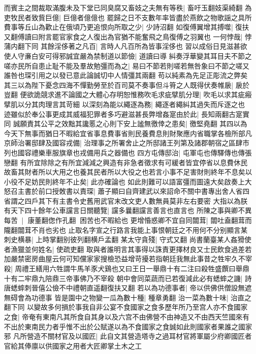 而賓主之間裁取滿腹未及下堂已同臭腐又畜妓之夫無有等秩|{
	畜吁玉翻妓渠綺翻}
為吏牧民者致貲巨億|{
	巨億者億億也}
罷歸之日不支數年率皆盡於燕飲之物歌謡之具所費事等丘山為歡止在俄頃乃更追恨向所取之少|{
	少詩沼翻}
如復傅翼增其搏噬|{
	復扶又翻傅讀曰附言罷官家食之人復出為官猶不能奮飛之鳥復傅之羽翼也}
一何悖哉|{
	悖蒲内翻下同}
其餘淫侈著之凡百|{
	言時人凡百所為皆事淫侈也}
習以成俗日見滋甚欲使人守亷白安可得邪誠宜嚴為禁制道以節儉|{
	道讀曰導}
糾奏浮華變其耳目夫不節之嗟亦民所自患止耻不能及羣故勉彊而為之|{
	易曰不節若則嗟若無咎象曰不節之嗟又誰咎也琛引用之以發已意此論誠切中人情彊其兩翻}
苟以純素為先足正彫流之弊矣其三以為陛下憂念四海不憚勤勞至於百司莫不奏事但斗筲之人既得伏奏帷扆|{
	扆於豈翻}
便欲詭競求進不論國之大體心存明恕惟務吹毛求疵擘肌分理|{
	吹毛以求其疵瘢擘肌以分其肉理言其苛細}
以深刻為能以繩逐為務|{
	繩逐者繩糾其過失而斥逐之也}
迹雖似於奉公事更成其威福犯罪者多巧避滋甚長弊增姦寔由於此|{
	長知兩翻古寔實同}
誠願責其公平之效黜其讒慝之心則下安上謐無徼倖之患矣|{
	徼堅堯翻}
其四以為今天下無事而猶日不暇給宜省事息費事省則民養費息則財聚應内省職掌各檢所部凡京師治署邸肆及國容戎備|{
	治理事之所署舍止之所邸諸王列第及諸郡朝宿之區肆市列也國容禮樂車服旗章也戎備用兵之器備也}
四方屯傳邸治|{
	屯軍屯也傳驛傳也傳張戀翻}
有所宜除除之有所宜減減之興造有非急者徵求有可緩者皆宜停省以息費休民故畜其財者所以大用之也養其民者所以大役之也若言小事不足害財則終年不息矣以小役不足妨民則終年不止矣|{
	此亦確論也}
如此則難可以語富彊而圖遠大矣啟奏上大怒召主書於前口授敇書以責琛|{
	蕭子顯曰自齊建武以來詔命不關中書專出舍人省四省謂之四戶其下有主書令史舊用武官末改文吏人數無員莫非左右要密}
大指以為朕有天下四十餘年公車讜言日關聽覽|{
	讜多曩翻讜言善言也直言也}
所陳之事與卿不異每苦|{
	康董翻偬作孔翻困苦也不暇給也}
更增惛惑卿不宜自同闒茸|{
	闒吐盍翻茸而隴翻闒茸不肖也劣也}
止取名字宣之行路言我能上事恨朝廷之不用何不分别顯言某刺史横暴|{
	上時掌翻别彼列翻横戶孟翻}
某太守貪殘|{
	守式又翻}
尚書蘭臺某人姦猾使者漁獵並何姓名|{
	使疏吏翻}
取與者誰明言其事得以誅責更擇材良又士民飲食過差若加嚴禁密房曲屋云何可知儻家家搜檢恐益增苛擾若指朝廷我無此事昔之牲牢久不宰殺|{
	周禮王繕用六牲謂牛馬羊豕犬鷄也又曰王日一舉鼎十有二注曰殺牲盛饌曰舉鼎十有二牢鼎九陪鼎三帝事佛乃不宰殺}
朝中會同菜蔬而已若復減此必有蟋蟀之譏|{
	詩唐蟋蟀刺晉僖公儉不中禮朝直遥翻復扶又翻}
若以為功德事者|{
	帝以供佛供僧設無遮無碍會為功德事}
皆是園中之物變一瓜為數十種|{
	種章勇翻}
治一菜為數十味|{
	治直之翻下同}
以變故多何損於事我自非公宴不食國家之食多歷年所乃至宫人亦不食國家之食|{
	帝奄有東南凡其所食自其身以及六宫不由佛營不由神造又不由西天竺國來有不出於東南民力者乎惟不出於公賦遂以為不食國家之食誠如此則國家者果誰之國家邪}
凡所營造不關材官及以國匠|{
	此自文其營造塔寺之過耳材官將軍屬少府卿國匠者官給其俸廪以供國家之用者大匠卿掌土木之工}
